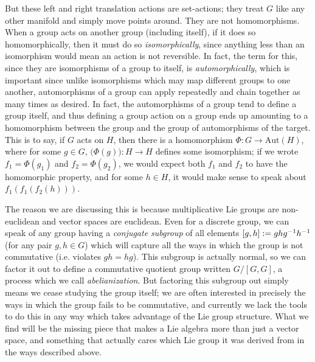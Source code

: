 \documentclass[11pt]{article}
\begin{document}
But these left and right translation actions are set-actions; they treat $G$ like any other manifold and simply move points around. They are not homomorphisms. When a group acts on another group (including itself), if it does so homomorphically, then it must do so \emph{isomorphically}, since anything less than an isomorphism would mean an action is not reversible. In fact, the term for this, since they are isomorphisms of a group to itself, is \emph{automorphically}, which is important since unlike isomorphisms which may map different groups to one another, automorphisms of a group can apply repeatedly and chain together as many times as desired. In fact, the automorphisms of a group tend to define a group itself, and thus defining a group action on a group ends up amounting to a homomorphism between the group and the group of automorphisms of the target. This is to say, if $G$ acts on $H$, then there is a homomorphism $\Phi \colon G \to \mathrm{Aut}(H)$, where for some $g \in G$, $\big(\Phi(g)\big) \colon H \to H$ defines some isomorphism; if we wrote $f_1 = \Phi(g_1)$ and $f_2 = \Phi(g_2)$, we would expect both $f_1$ and $f_2$ to have the homomorphic property, and for some $h\in H$, it would make sense to speak about $f_1(f_1(f_2(h)))$.

The reason we are discussing this is because multiplicative Lie groups are non-euclidean and vector spaces are euclidean. Even for a discrete group, we can speak of any group having a \emph{conjugate subgroup} of all elements $[g,h] := ghg^{-1} h^{-1}$ (for any pair $g,h \in G$) which will capture all the ways in which the group is not commutative (i.e. violates $gh = hg$). This subgroup is actually normal, so we can factor it out to define a commutative quotient group written $G/[G,G]$, a process which we call \emph{abelianization}. But factoring this subgroup out simply means we cease studying the group itself; we are often interested in precisely the ways in which the group fails to be commutative, and currently we lack the tools to do this in any way which takes advantage of the Lie group structure. What we find will be the missing piece that makes a Lie algebra more than just a vector space, and something that actually cares which Lie group it was derived from in the ways described above.
\end{document}
